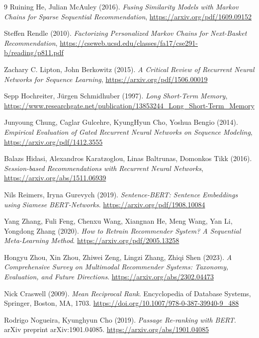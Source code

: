 \begin{thebibliography}{9}
    Ruining He, Julian McAuley (2016). \textit{Fusing Similarity Models with Markov Chains for Sparse Sequential Recommendation}, \url{https://arxiv.org/pdf/1609.09152}

    Steffen Rendle (2010). \textit{Factorizing Personalized Markov Chains for Next-Basket Recommendation}, \url{https://cseweb.ucsd.edu/classes/fa17/cse291-b/reading/p811.pdf}

    Zachary C. Lipton, John Berkowitz (2015). \textit{A Critical Review of Recurrent Neural Networks for Sequence Learning}, \url{https://arxiv.org/pdf/1506.00019}

    Sepp Hochreiter, Jürgen Schmidhuber (1997). \textit{Long Short-Term Memory}, \url{https://www.researchgate.net/publication/13853244_Long_Short-Term_Memory}

    Junyoung Chung, Caglar Gulcehre, KyungHyun Cho, Yoshua Bengio (2014). \textit{Empirical Evaluation of Gated Recurrent Neural Networks on Sequence Modeling}, \url{https://arxiv.org/pdf/1412.3555}

    Balazs Hidasi, Alexandros Karatzoglou, Linas Baltrunas, Domonkos Tikk (2016). \textit{Session-based Recommendations with Recurrent Neural Networks}, \url{https://arxiv.org/abs/1511.06939}

    Nils Reimers, Iryna Gurevych (2019). 
    \textit{Sentence-BERT: Sentence Embeddings using Siamese BERT-Networks}. 
    \url{https://arxiv.org/pdf/1908.10084}

    Yang Zhang, Fuli Feng, Chenxu Wang, Xiangnan He, Meng Wang, Yan Li, Yongdong Zhang (2020). 
    \textit{How to Retrain Recommender System? A Sequential Meta-Learning Method}. 
    \url{https://arxiv.org/pdf/2005.13258}

    Hongyu Zhou, Xin Zhou, Zhiwei Zeng, Lingzi Zhang, Zhiqi Shen (2023). 
    \textit{A Comprehensive Survey on Multimodal Recommender Systems: Taxonomy, Evaluation, and Future Directions}. 
    \url{https://arxiv.org/abs/2302.04473}

    Nick Craswell (2009). 
    \textit{Mean Reciprocal Rank}. 
    Encyclopedia of Database Systems, Springer, Boston, MA, 1703. \url{https://doi.org/10.1007/978-0-387-39940-9_488}

    Rodrigo Nogueira, Kyunghyun Cho (2019). 
    \textit{Passage Re-ranking with BERT}. 
    arXiv preprint arXiv:1901.04085. \url{https://arxiv.org/abs/1901.04085}


\end{thebibliography}
